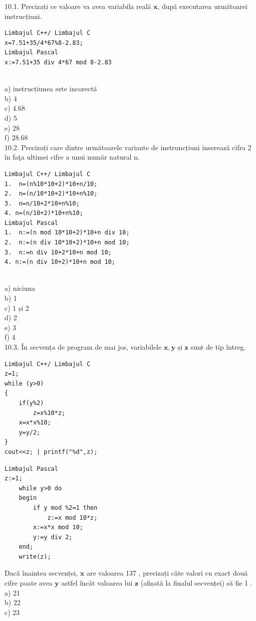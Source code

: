 10.1. Precizați ce valoare va avea variabila reală $\mathbf{x}$, după executarea următoarei instrucțiuni.
\begin{verbatim}
Limbajul C++/ Limbajul C
x=7.51+35/4*67%8-2.83;
Limbajul Pascal
x:=7.51+35 div 4*67 mod 8-2.83
\end{verbatim}
\\
a) instrucțiunea este incorectă
\\
b) 4
\\
c) 4.68
\\
d) 5
\\
e) 28
\\
f) 28.68
\\
10.2. Precizați care dintre următoarele variante de instruncțiuni inserează cifra 2 în faţa ultimei cifre a unui număr natural n.
\\
\begin{verbatim}
Limbajul C++/ Limbajul C
1.  n=(n%10*10+2)*10+n/10; 
2.  n=(n/10*10+2)*10+n%10; 
3.  n=n/10+2*10+n%10; 
4. n=(n/10+2)*10+n%10; 
Limbajul Pascal
1.  n:=(n mod 10*10+2)*10+n div 10; 
2.  n:=(n div 10*10+2)*10+n mod 10; 
3.  n:=n div 10+2*10+n mod 10; 
4. n:=(n div 10+2)*10+n mod 10;
\end{verbatim}
\\
a) niciuna
\\
b) 1
\\
c) 1 și 2
\\
d) 2
\\
e) 3
\\
f) 4
\\
10.3. În secvența de program de mai jos, variabilele $\mathbf{x}, \mathbf{y}$ și $\mathbf{z}$ sunt de tip întreg.
\begin{verbatim}
Limbajul C++/ Limbajul C
z=1;
while (y>0)
{
    if(y%2)
        z=x%10*z;
    x=x*x%10;
    y=y/2;
}
cout<<z; | printf("%d",z);
\end{verbatim}
\begin{verbatim}
Limbajul Pascal
z:=1;
    while y>0 do
    begin
        if y mod %2=1 then
            z:=x mod 10*z;
        x:=x*x mod 10;
        y:=y div 2;
    end;
    write(z);
\end{verbatim}
Dacă înaintea secvenței, $\mathbf{x}$ are valoarea 137 , precizați câte valori cu exact două cifre poate avea $\mathbf{y}$ astfel încât valoarea lui $\mathbf{z}$ (afișată la finalul secvenței) să fie 1 .
\\
a) 21
\\
b) 22
\\
c) 23
\\
